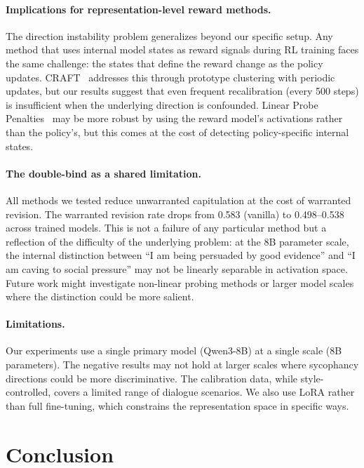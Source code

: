 \documentclass[11pt,a4paper]{article}
\begin{document}
\paragraph{Implications for representation-level reward methods.}
The direction instability problem generalizes beyond our specific setup. Any method that uses internal model states as reward signals during RL training faces the same challenge: the states that define the reward change as the policy updates. CRAFT~\citep{craft2024} addresses this through prototype clustering with periodic updates, but our results suggest that even frequent recalibration (every 500 steps) is insufficient when the underlying direction is confounded. Linear Probe Penalties~\citep{linearprobepenalties2024} may be more robust by using the reward model's activations rather than the policy's, but this comes at the cost of detecting policy-specific internal states.

\paragraph{The double-bind as a shared limitation.}
All methods we tested reduce unwarranted capitulation at the cost of warranted revision. The warranted revision rate drops from 0.583 (vanilla) to 0.498--0.538 across trained models. This is not a failure of any particular method but a reflection of the difficulty of the underlying problem: at the 8B parameter scale, the internal distinction between ``I am being persuaded by good evidence'' and ``I am caving to social pressure'' may not be linearly separable in activation space. Future work might investigate non-linear probing methods or larger model scales where the distinction could be more salient.

\paragraph{Limitations.}
Our experiments use a single primary model (Qwen3-8B) at a single scale (8B parameters). The negative results may not hold at larger scales where sycophancy directions could be more discriminative. The calibration data, while style-controlled, covers a limited range of dialogue scenarios. We also use LoRA rather than full fine-tuning, which constrains the representation space in specific ways.

\section{Conclusion}
\end{document}
